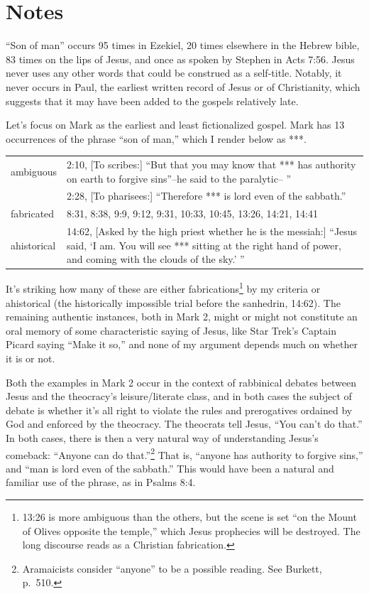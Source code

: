 \documentclass[10pt,twoside]{article} %
\newcommand{\quotesize}{\normalsize{}}
\newcommand{\maintextquotesize}{\renewcommand{\quotesize}{\large{}}}
\newcommand{\notequotesize}{\renewcommand{\quotesize}{\normalsize{}}}
\DeclareRobustCommand{\stixdangerousbend}{%
  {\usefont{U}{stixbbit}{m}{it}\symbol{"F6}}%
}
\newcommand{\dangerousbend}{\rotatebox[origin=c]{-10}{\stixdangerousbend}}
\newcommand{\link}[2]{\protect\jumplink{anchor-#1}{\textcolor{blue}{#2}}} %
\newcommand{\notewithoutbackref}[1]{\link{note-#1}{\dangerousbend\pageref{note:#1}}}
\newenvironment{notesection}[1]{
  \setcounter{secnumdepth}{0}          %
  \section*{#1}
  \setcounter{secnumdepth}{2}          %
  \notequotesize
}%
{
  \maintextquotesize
}
\begin{document}
\begin{notesection}{Notes}
``Son of man'' occurs 95 times in Ezekiel, 20 times elsewhere in the Hebrew bible, 83 times
on the lips of Jesus, and once as spoken by Stephen in Acts 7:56. Jesus never uses any other words that could be construed as a self-title.
Notably, it never occurs in Paul, the earliest
written record of Jesus or of Christianity, which suggests that it may have been added to the gospels relatively late.


Let's focus on Mark  as the earliest and least fictionalized gospel.
Mark has 13 occurrences of the phrase ``son of man,'' which I render below as ***.

\begin{tabular}{lp{70mm}}
ambiguous & 2:10, [To scribes:] ``But that you may know that *** has authority on earth to forgive sins''--he said to the paralytic-- '' \\
          & 2:28, [To pharisees:] ``Therefore *** is lord even of the sabbath.'' \\
fabricated & 8:31, 8:38, 9:9, 9:12, 9:31, 10:33, 10:45, 13:26, 14:21, 14:41 \\
ahistorical & 14:62, [Asked by the high priest whether he is the messiah:]
                 ``Jesus said, `I am. You will see *** sitting at the right hand of power, and coming with the clouds of the sky.' ''
\end{tabular}

It's striking how many of these are either fabrications\footnote{13:26 is more ambiguous than the others, but the scene is set
``on the Mount of Olives opposite the temple,'' which Jesus prophecies will be destroyed. The long discourse reads as a Christian
fabrication.} by my criteria \notewithoutbackref{about-this-doc}
or ahistorical (the historically impossible trial before the sanhedrin, 14:62).
The remaining authentic instances, both in Mark 2, might or might not constitute an oral memory
of some characteristic saying of Jesus, like Star Trek's Captain Picard saying ``Make it so,''
and none of my argument depends much on whether it is or not.

Both the examples in Mark 2 occur in the context of rabbinical debates between
Jesus and the theocracy's leisure/literate class, and in both cases the subject of debate is whether it's all
right to violate the rules and prerogatives ordained by God and enforced by the theocracy.
The theocrats tell Jesus, ``You can't do that.''
In both cases, there is then a very natural way of understanding Jesus's comeback: ``Anyone can do that.''\footnote{Aramaicists consider
``anyone'' to be a possible reading. See Burkett, p.~510.}
That is, ``anyone has authority to forgive sins,'' and ``man is lord even of the sabbath.'' This would have been a natural
and familiar use of the phrase, as in Psalms 8:4.


\end{notesection}
\end{document}
